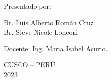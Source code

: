 \begin{titlepage}
\begin{center}
		{\large {Presentado por:}}		
		
		{\large {Br. Luis Alberto Román Cruz	}}\\
		{\large {Br. Steve Nicole Lonconi	}}
		\vspace{0.5cm}
		
		{\large {Docente: Ing. Maria Isabel Acurio.}}
		\vspace{0.5cm}
		
		{\large {CUSCO – PERÚ }}\\
		{\large {2023 }}
		\vspace{0.5cm}
		
		
	\end{center}
\end{titlepage}